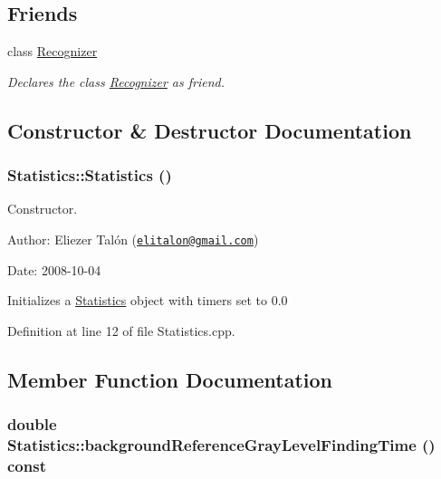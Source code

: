 \subsection*{Friends}
\begin{CompactItemize}
\item 
\hypertarget{class_statistics_11123fa51c07995419270030024a7dfe}{
class \hyperlink{class_statistics_11123fa51c07995419270030024a7dfe}{Recognizer}}
\label{class_statistics_11123fa51c07995419270030024a7dfe}

\begin{CompactList}\small\item\em Declares the class \hyperlink{class_recognizer}{Recognizer} as friend. \item\end{CompactList}\end{CompactItemize}


\subsection{Constructor \& Destructor Documentation}
\hypertarget{class_statistics_60ddd90a571ed4c3ce8c0f6317a36d63}{
\subsubsection[Statistics]{\setlength{\rightskip}{0pt plus 5cm}Statistics::Statistics ()}}
\label{class_statistics_60ddd90a571ed4c3ce8c0f6317a36d63}


Constructor. 

\begin{Desc}
\item[Author:]Eliezer Talón (\href{mailto:elitalon@gmail.com}{\tt elitalon@gmail.com}) \end{Desc}
\begin{Desc}
\item[Date:]2008-10-04\end{Desc}
Initializes a \hyperlink{class_statistics}{Statistics} object with timers set to 0.0 

Definition at line 12 of file Statistics.cpp.

\subsection{Member Function Documentation}
\hypertarget{class_statistics_565e90b1940d12bb2a2661f6dcea230d}{
\subsubsection[backgroundReferenceGrayLevelFindingTime]{\setlength{\rightskip}{0pt plus 5cm}double Statistics::backgroundReferenceGrayLevelFindingTime () const}}
\label{class_statistics_565e90b1940d12bb2a2661f6dcea230d}


